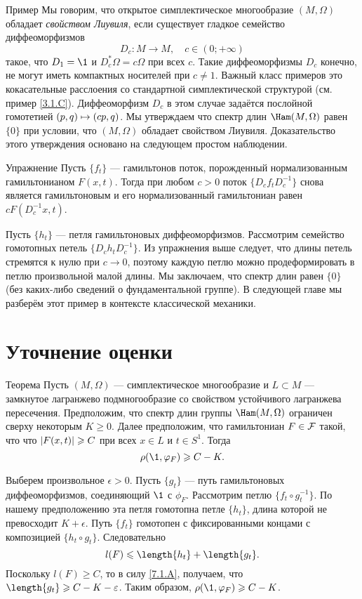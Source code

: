 \begin{ex}{Пример}\label{7.3.B}
Мы говорим, что открытое симплектическое многообразие $(M, \Omega)$
обладает \emph{свойством Лиувиля}, если
существует гладкое семейство диффеоморфизмов 
\[D_c: M \to M,\quad c \in (0; + \infty)\]
такое, что $D_1 = \1$ и $D_c^\ast \Omega = c\Omega$ при всех $c$.
Такие диффеоморфизмы $D_c$ конечно, не могут иметь компактных
носителей при $c \ne 1$. 
Важный класс примеров это кокасательные расслоения со стандартной
симплектической структурой (см. пример \ref{3.1.C}).
Диффеоморфизм $D_c$ в этом случае задаётся послойной гомотетией $(p,
q) \z\mapsto (cp, q)$. 
Мы утверждаем что спектр длин $\Ham (M, \Omega)$ равен $\{0\}$ при
условии, что $(M, \Omega)$ 
обладает свойством Лиувиля.
Доказательство этого утверждения основано на следующем простом наблюдении.
\end{ex}

\begin{ex*}{Упражнение}
Пусть $\{f_t\}$ — гамильтонов поток, порожденный нормализованным гамильтонианом $F (x, t)$.
Тогда при любом $c> 0$ поток $\{D_c f_t D_c^{-1}\}$ снова является
гамильтоновым и его нормализованный гамильтониан равен $cF (D_c^{-1} x, t)$.
\end{ex*}

Пусть $\{h_t\}$ — петля гамильтоновых диффеоморфизмов.
Рассмотрим семейство гомотопных петель $\{D_c h_t D_c ^{-1}\}$.
Из упражнения выше следует, что длины петель стремятся к нулю при $c \to 0$, поэтому каждую петлю можно продеформировать в петлю произвольной малой длины.
Мы заключаем, что спектр длин равен $\{0\}$ (без каких-либо сведений о фундаментальной группе).
В следующей главе мы разберём этот пример в контексте классической механики.

\section{Уточнение оценки}

\begin{thm}{Теорема}\label{7.4.A}
Пусть $(M, \Omega)$ — симплектическое многообразие и $L \subset M$
— замкнутое лагранжево подмногообразие со свойством устойчивого
лагранжева пересечения. 
Предположим, что спектр длин группы $\Ham (M, \Omega)$ ограничен
сверху некоторым $K \ge 0$. 
Далее предположим, что гамильтониан $F \in \mathcal{F}$ такой, что что $| F (x,
t) | \z\ge C$ при всех $x \in L$ и $t \in S^1$. 
Тогда 
\[\rho (\1, \phi_F) \ge C - K.\]
\end{thm}

Выберем произвольное $\epsilon> 0$. 
Пусть $\{g_t\}$ — путь гамильтоновых диффеоморфизмов, соединяющий $\1$ с $\phi_F$.
Рассмотрим петлю $\{f_t \circ g_t ^{-1}\}$.
По нашему предположению эта петля гомотопна петле $\{h_t\}$, длина которой не превосходит $K + \epsilon$.
Путь $\{f_t\}$ гомотопен с фиксированными концами с композицией $\{h_t \circ g_t\}$.
Следовательно
\[l (F) \le \length \{h_t\} + \length \{g_t\}.\]
Поскольку $l (F) \ge C$, то в силу \ref{7.1.A}, получаем, что $\length \{g_t\} \ge C \z- K - \epsilon$.
Таким образом, $\rho (\1, \phi_F) \ge C - K$.
\qeds
